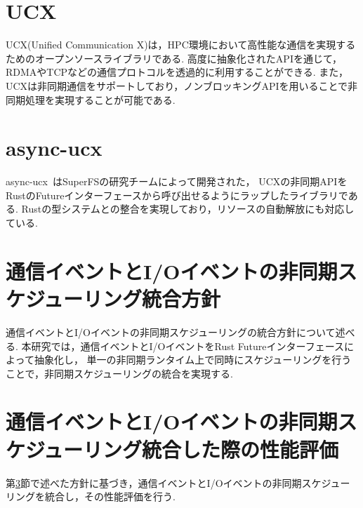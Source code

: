 \documentclass[a4paper,11pt]{jreport}
\begin{document}
\section{UCX}
UCX(Unified Communication X)は，HPC環境において高性能な通信を実現するためのオープンソースライブラリである.
高度に抽象化されたAPIを通じて，RDMAやTCPなどの通信プロトコルを透過的に利用することができる.
また，UCXは非同期通信をサポートしており，ノンブロッキングAPIを用いることで非同期処理を実現することが可能である.

\section{async-ucx}
async-ucx~\cite{async-ucx}はSuperFSの研究チームによって開発された，
UCXの非同期APIをRustのFutureインターフェースから呼び出せるようにラップしたライブラリである.
Rustの型システムとの整合を実現しており，リソースの自動解放にも対応している.


\section{通信イベントとI/Oイベントの非同期スケジューリング統合方針}\label{sec:policy}
通信イベントとI/Oイベントの非同期スケジューリングの統合方針について述べる.
本研究では，通信イベントとI/OイベントをRust Futureインターフェースによって抽象化し，
単一の非同期ランタイム上で同時にスケジューリングを行うことで，非同期スケジューリングの統合を実現する.



\section{通信イベントとI/Oイベントの非同期スケジューリング統合した際の性能評価}\label{sec:io_rpc_eval}
第\ref{sec:policy}節で述べた方針に基づき，通信イベントとI/Oイベントの非同期スケジューリングを統合し，その性能評価を行う.
\end{document}
